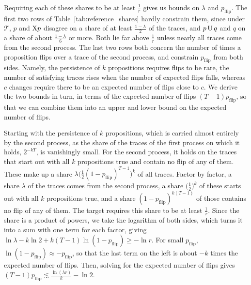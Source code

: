 \documentclass[titlepage,a4paper,11pt]{report}
\begin{document}
    Requiring each of these shares to be at least $\frac1r$ gives us bounds on $\lambda$ and $p_{\text{flip}}$. The first two rows of Table~\ref{tab:reference_shares} hardly constrain them, since under $\mathcal T$, $p$ and $\text{X} p$ disagree on a share of at least $\frac{1-\lambda}{2}$ of the traces, and $p\,\text{U}\,q$ and $q$ on a share of about $\frac{1-\lambda}{6}$ or more. Both lie far above $\frac1r$ unless nearly all traces come from the second process. The last two rows both concern the number of times a proposition flips over a trace of the second process, and constrain $p_{\text{flip}}$ from both sides. Namely, the persistence of $k$ propositions requires flips to be rare, the number of satisfying traces rises when the number of expected flips falls, whereas $c$ changes require there to be an expected number of flips close to $c$. We derive the two bounds in turn, in terms of the expected number of flips $(T-1)p_{\text{flip}}$, so that we can combine them into an upper and lower bound on the expected number of flips.

    Starting with the persistence of $k$ propositions, which is carried almost entirely by the second process, as the share of the traces of the first process on which it holds, $2^{-kT}$, is vanishingly small. For the second process, it holds on the traces that start out with all $k$ propositions true and contain no flip of any of them. These make up a share $\lambda\bigl(\frac12(1-p_{\text{flip}})^{T-1}\bigr)^k$ of all traces. Factor by factor, a share $\lambda$ of the traces comes from the second process, a share $\bigl(\frac12\bigr)^k$ of these starts out with all $k$ propositions true, and a share $(1-p_{\text{flip}})^{k(T-1)}$ of those contains no flip of any of them. The target requires this share to be at least $\frac1r$. Since the share is a product of powers, we take the logarithm of both sides, which turns it into a sum with one term for each factor, giving $\ln\lambda-k\ln2+k(T-1)\ln(1-p_{\text{flip}})\ge-\ln r$. For small $p_{\text{flip}}$, $\ln(1-p_{\text{flip}})\approx-p_{\text{flip}}$, so that the last term on the left is about $-k$ times the expected number of flips. Then, solving for the expected number of flips gives $(T-1)p_{\text{flip}}\lesssim\frac{\ln(\lambda r)}{k}-\ln2$.
\end{document}
